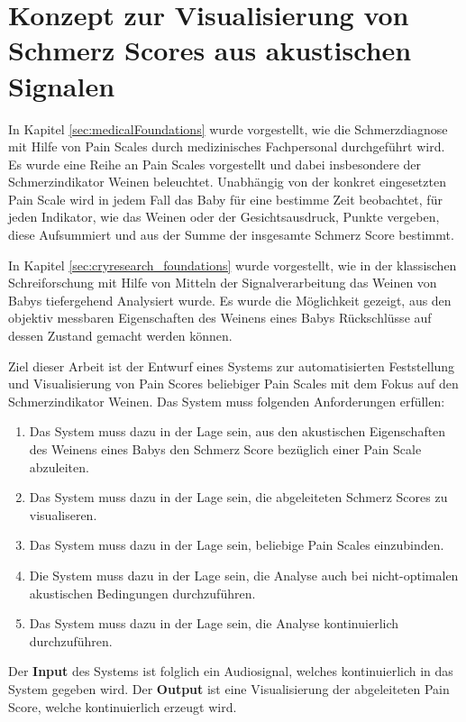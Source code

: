 \chapter{Konzept zur Visualisierung von Schmerz Scores aus akustischen Signalen}

In Kapitel \ref{sec:medicalFoundations} wurde vorgestellt, wie die Schmerzdiagnose mit Hilfe von Pain Scales durch medizinisches Fachpersonal durchgeführt wird. Es wurde eine Reihe an Pain Scales vorgestellt und dabei insbesondere der Schmerzindikator \glqq Weinen\grqq{} beleuchtet. Unabhängig von der konkret eingesetzten Pain Scale wird in jedem Fall das Baby für eine bestimme Zeit beobachtet, für jeden Indikator, wie das Weinen oder der Gesichtsausdruck, Punkte vergeben, diese Aufsummiert und aus der Summe der insgesamte Schmerz Score bestimmt. 

In Kapitel \ref{sec:cryresearch_foundations} wurde vorgestellt, wie in der klassischen Schreiforschung mit Hilfe von Mitteln der Signalverarbeitung das Weinen von Babys tiefergehend Analysiert wurde. Es wurde die Möglichkeit gezeigt, aus den objektiv messbaren Eigenschaften des Weinens eines Babys Rückschlüsse auf dessen Zustand gemacht werden können.

Ziel dieser Arbeit ist der Entwurf eines Systems zur automatisierten Feststellung und Visualisierung von Pain Scores beliebiger Pain Scales mit dem Fokus auf den Schmerzindikator \glqq Weinen\grqq. Das System muss folgenden Anforderungen erfüllen:

\begin{enumerate}
	\item Das System muss dazu in der Lage sein, aus den akustischen Eigenschaften des Weinens eines Babys den Schmerz Score bezüglich einer Pain Scale abzuleiten.
	\item Das System muss dazu in der Lage sein, die abgeleiteten Schmerz Scores zu visualiseren.
	\item Das System muss dazu in der Lage sein, beliebige Pain Scales einzubinden. 
	\item Die System muss dazu in der Lage sein,  die Analyse auch bei nicht-optimalen akustischen Bedingungen durchzuführen.
	\item Das System muss dazu in der Lage sein, die Analyse kontinuierlich durchzuführen.
\end{enumerate}

Der \textbf{Input} des Systems ist folglich ein Audiosignal, welches kontinuierlich in das System gegeben wird. Der \textbf{Output} ist eine Visualisierung der abgeleiteten Pain Score, welche kontinuierlich erzeugt wird.

